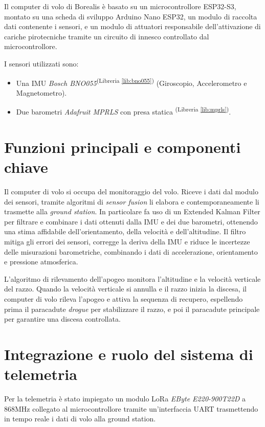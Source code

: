 \documentclass[12pt,a4paper,twoside]{book}
\newcommand{\libref}[1]{\textsuperscript{(Libreria \ref{#1})}}
\begin{document}
Il computer di volo di Borealis è basato su un microcontrollore ESP32-S3, montato
su una scheda di sviluppo Arduino Nano ESP32, un modulo di raccolta dati contenente
i sensori, e un modulo di attuatori responsabile dell'attivazione di cariche
pirotecniche tramite un circuito di innesco controllato dal microcontrollore.%

I sensori utilizzati sono:
\begin{itemize}
    \item Una \ac{IMU} \emph{Bosch BNO055}\libref{lib:bno055}
          (Giroscopio, Accelerometro e Magnetometro).
    \item Due barometri \emph{Adafruit MPRLS} con presa statica \libref{lib:mprls}.
\end{itemize}
\section{Funzioni principali e componenti chiave}
Il computer di volo si occupa del monitoraggio del volo. Riceve i dati dal modulo
dei sensori, tramite algoritmi di \emph{sensor fusion} li elabora e
contemporaneamente li trasmette alla \emph{ground station}.
In particolare fa uso di un Extended Kalman Filter per filtrare e combinare i
dati ottenuti dalla \ac{IMU} e dei due barometri, ottenendo una stima
affidabile dell'orientamento, della velocità e dell'altitudine.
Il filtro mitiga gli errori dei sensori, corregge la deriva della \ac{IMU} e riduce
le incertezze delle misurazioni barometriche, combinando i dati di accelerazione,
orientamento e pressione atmosferica.

L'algoritmo di rilevamento dell'apogeo monitora l'altitudine e la velocità verticale
del razzo.
Quando la velocità verticale si annulla e il razzo inizia la discesa, il
computer di volo rileva l'apogeo e attiva la sequenza di recupero,
espellendo prima il paracadute \emph{drogue} per stabilizzare il razzo, e poi
il paracadute principale per garantire una discesa controllata.

\section{Integrazione e ruolo del sistema di telemetria}
Per la telemetria è stato impiegato un modulo \ac{LoRa} \emph{EByte E220-900T22D}
a 868MHz collegato al microcontrollore tramite un'interfaccia \ac{UART}
trasmettendo in tempo reale i dati di volo alla ground station.
\end{document}
